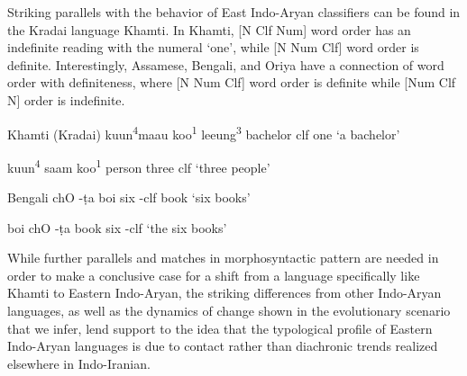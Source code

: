\documentclass[11pt]{article}
\begin{document}
%
Striking parallels with the behavior of East Indo-Aryan classifiers can be found in the Kradai language Khamti. 
In Khamti, [N Clf Num] word order has an indefinite reading with the numeral `one', while [N Num Clf] word order is definite. 
Interestingly, Assamese, Bengali, and Oriya have a connection of word order with definiteness, where [N Num Clf] word order is definite while [Num Clf N] order is indefinite. 
\begin{example} Khamti (Kradai)
\gll kuun\textsuperscript{4}maau koo\textsuperscript{1} leeung\textsuperscript{3}
bachelor {\sc clf} one
\glt `a bachelor' \citep[8, shortened]{Inglis2007}
\glend
\end{example}
\begin{example}
\gll kuun\textsuperscript{4} saam koo\textsuperscript{1}
person three {\sc clf}
\glt `three people' \citep[11, shortened]{Inglis2007}
\glend
\end{example}
\begin{example} Bengali
\gll ch{\IPA O} -\d{t}a boi
six {\sc -clf} book
\glt `six books' \citep[136]{David2015}
\glend
\end{example}
\begin{example}
\gll boi ch{\IPA O} -\d{t}a
book six {\sc -clf}
\glt `the six books' \citep[137]{David2015}
\glend
\end{example}
While further parallels and matches in morphosyntactic pattern are needed in order to make a conclusive case for a shift from a language specifically like Khamti to Eastern Indo-Aryan, the striking differences from other Indo-Aryan languages, as well as the dynamics of change shown in the evolutionary scenario that we infer, lend support to the idea that the typological profile of Eastern Indo-Aryan languages is due to contact rather than diachronic trends realized elsewhere in Indo-Iranian.
\end{document}
